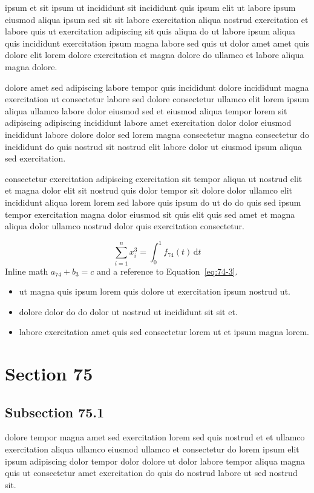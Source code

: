 \documentclass{article}
\begin{document}
ipsum et sit ipsum ut incididunt sit incididunt quis ipsum elit ut labore ipsum eiusmod aliqua ipsum sed sit sit labore exercitation aliqua nostrud exercitation et labore quis ut exercitation adipiscing sit quis aliqua do ut labore ipsum aliqua quis incididunt exercitation ipsum magna labore sed quis ut dolor amet amet quis dolore elit lorem dolore exercitation et magna dolore do ullamco et labore aliqua magna dolore.

dolore amet sed adipiscing labore tempor quis incididunt dolore incididunt magna exercitation ut consectetur labore sed dolore consectetur ullamco elit lorem ipsum aliqua ullamco labore dolor eiusmod sed et eiusmod aliqua tempor lorem sit adipiscing adipiscing incididunt labore amet exercitation dolor dolor eiusmod incididunt labore dolore dolor sed lorem magna consectetur magna consectetur do incididunt do quis nostrud sit nostrud elit labore dolor ut eiusmod ipsum aliqua sed exercitation.

consectetur exercitation adipiscing exercitation sit tempor aliqua ut nostrud elit et magna dolor elit sit nostrud quis dolor tempor sit dolore dolor ullamco elit incididunt aliqua lorem lorem sed labore quis ipsum do ut do do quis sed ipsum tempor exercitation magna dolor eiusmod sit quis elit quis sed amet et magna aliqua dolor ullamco nostrud dolor quis exercitation consectetur.

\begin{equation}\label{eq:74-3}
  \sum_{i=1}^{n} x_i^{3} = \int_0^1 f_{74}(t)\,\mathrm{d}t
\end{equation}
Inline math $a_{74} + b_{3} = c$ and a reference to Equation~\eqref{eq:74-3}.

\begin{itemize}
  \item ut magna quis ipsum lorem quis dolore ut exercitation ipsum nostrud ut.
  \item dolore dolor do do dolor ut nostrud ut incididunt sit sit et.
  \item labore exercitation amet quis sed consectetur lorem ut et ipsum magna lorem.
\end{itemize}

\section{Section 75}\label{sec:75}
\subsection{Subsection 75.1}\label{sec:75-1}
dolore tempor magna amet sed exercitation lorem sed quis nostrud et et ullamco exercitation aliqua ullamco eiusmod ullamco et consectetur do lorem ipsum elit ipsum adipiscing dolor tempor dolor dolore ut dolor labore tempor aliqua magna quis ut consectetur amet exercitation do quis do nostrud labore ut sed nostrud sit.
\end{document}

